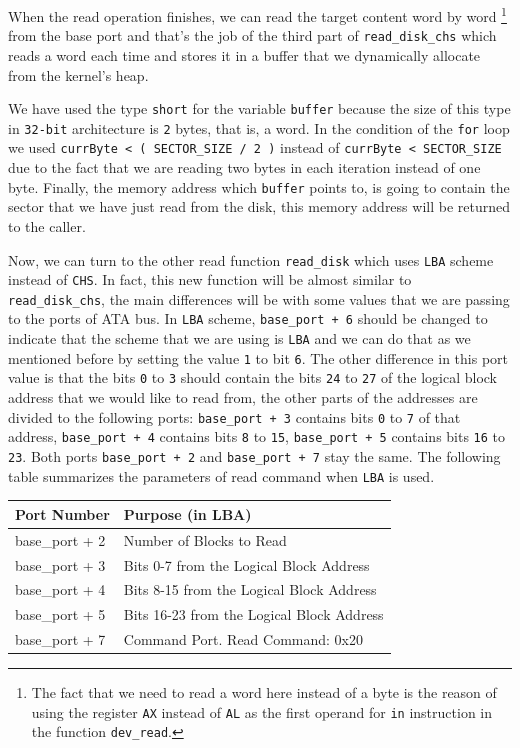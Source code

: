 When the read operation finishes, we can read the target content word by
word \footnote{The fact that we need to read a word here instead of a
  byte is the reason of using the register \lstinline!AX! instead of
  \lstinline!AL! as the first operand for \lstinline!in! instruction in
  the function \lstinline!dev_read!.} from the base port and that's the
job of the third part of \lstinline!read_disk_chs! which reads a word
each time and stores it in a buffer that we dynamically allocate from
the kernel's heap.

We have used the type \lstinline!short! for the variable
\lstinline!buffer! because the size of this type in \lstinline!32-bit!
architecture is \lstinline!2! bytes, that is, a word. In the condition
of the \lstinline!for! loop we used
\lstinline!currByte < ( SECTOR_SIZE / 2 )! instead of
\lstinline!currByte < SECTOR_SIZE! due to the fact that we are reading
two bytes in each iteration instead of one byte. Finally, the memory
address which \lstinline!buffer! points to, is going to contain the
sector that we have just read from the disk, this memory address will be
returned to the caller.

Now, we can turn to the other read function \lstinline!read_disk! which
uses \lstinline!LBA! scheme instead of \lstinline!CHS!. In fact, this
new function will be almost similar to \lstinline!read_disk_chs!, the
main differences will be with some values that we are passing to the
ports of ATA bus. In \lstinline!LBA! scheme, \lstinline!base_port + 6!
should be changed to indicate that the scheme that we are using is
\lstinline!LBA! and we can do that as we mentioned before by setting the
value \lstinline!1! to bit \lstinline!6!. The other difference in this
port value is that the bits \lstinline!0! to \lstinline!3! should
contain the bits \lstinline!24! to \lstinline!27! of the logical block
address that we would like to read from, the other parts of the
addresses are divided to the following ports: \lstinline!base_port + 3!
contains bits \lstinline!0! to \lstinline!7! of that address,
\lstinline!base_port + 4! contains bits \lstinline!8! to \lstinline!15!,
\lstinline!base_port + 5! contains bits \lstinline!16! to
\lstinline!23!. Both ports \lstinline!base_port + 2! and
\lstinline!base_port + 7! stay the same. The following table summarizes
the parameters of read command when \lstinline!LBA! is used.

\begin{longtable}[]{@{}ll@{}}
\toprule
Port Number & Purpose (in LBA)\tabularnewline
\midrule
\endhead
base\_port + 2 & Number of Blocks to Read\tabularnewline
base\_port + 3 & Bits 0-7 from the Logical Block Address\tabularnewline
base\_port + 4 & Bits 8-15 from the Logical Block Address\tabularnewline
base\_port + 5 & Bits 16-23 from the Logical Block
Address\tabularnewline
base\_port + 7 & Command Port. Read Command: 0x20\tabularnewline
\bottomrule
\end{longtable}

